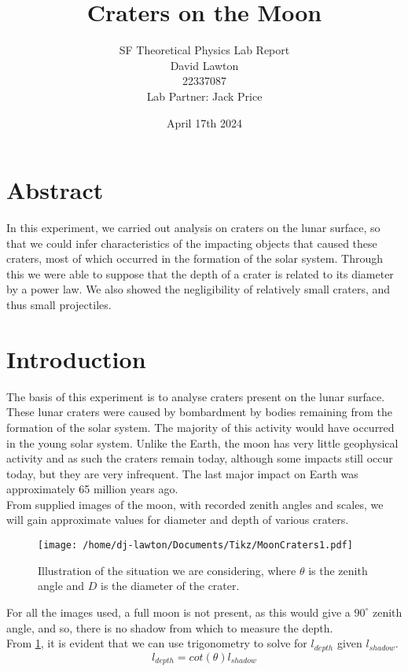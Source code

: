 \documentclass{article}
\title{Craters on the Moon}
\author{SF Theoretical Physics Lab Report\\David Lawton\\22337087\\Lab Partner: Jack Price}
\date{April 17th 2024}
\begin{document}
\maketitle
\vfill
\tableofcontents

\newpage
\section{Abstract}
In this experiment, we carried out analysis on craters on the lunar surface, so that we could infer characteristics of the impacting objects that caused these craters, most of which occurred in the formation of the solar system.
\indent Through this we were able to suppose that the depth of a crater is related to its diameter by a power law. We also showed the negligibility of relatively small craters, and thus small projectiles.
\section{Introduction}
The basis of this experiment is to analyse craters present on the lunar surface. These lunar craters were caused by bombardment by bodies remaining from the formation of the solar system. The majority of this activity would have occurred in the young solar system. Unlike the Earth, the moon has very little geophysical activity and as such the craters remain today, although some impacts still occur today, but they are very infrequent. The last major impact on Earth was approximately 65 million years ago.\\
\indent From supplied images of the moon, with recorded zenith angles and scales, we will gain approximate values for diameter and depth of various craters.\\
\begin{figure}[H]
\begin{center}
\texttt{[image: /home/dj-lawton/Documents/Tikz/MoonCraters1.pdf]}
\caption{\label{fig:zenith}Illustration of the situation we are considering, where $\theta$ is the zenith angle and $D$ is the diameter of the crater.}
\end{center}
\end{figure}
For all the images used, a full moon is not present, as this would give a $90^\circ$ zenith angle, and so, there is no shadow from which to measure the depth.\\
\indent From \ref{fig:zenith}, it is evident that we can use trigonometry to solve for $l_{depth}$ given $l_{shadow}$.
\begin{equation}
l_{depth}= cot(\theta)l_{shadow}
\end{equation}
\end{document}

